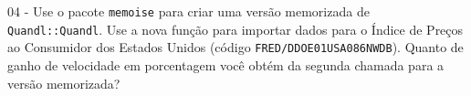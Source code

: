 \documentclass[
  11pt,
]{book}
\begin{document}
04 -
Use o pacote \texttt{memoise} para criar uma versão memorizada de \texttt{Quandl::Quandl}. Use a nova função para importar dados para o Índice de Preços ao Consumidor dos Estados Unidos (código \texttt{\textquotesingle{}FRED/DDOE01USA086NWDB\textquotesingle{}}). Quanto de ganho de velocidade em porcentagem você obtém da segunda chamada para a versão memorizada?

  

\printindex
\end{document}
